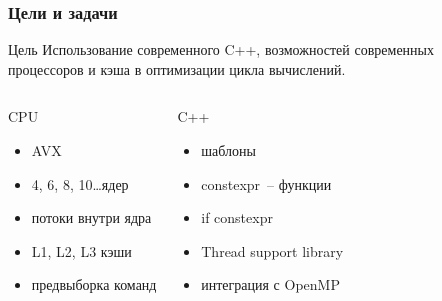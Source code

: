 \documentclass[presentation,18pt]{beamer}
\begin{document}
\begin{frame}[t]
	\label{goals}
	\frametitle{Цели и задачи}

	\begin{block}{Цель}
		Использование современного C++, возможностей современных процессоров и 
		кэша в оптимизации цикла вычислений.
	\end{block}

	\begin{columns}

		\begin{block}{CPU}
			\begin{itemize}
				\item AVX
				\item 4, 6, 8, 10\ldots ядер
				\item потоки внутри ядра
				\item L1, L2, L3 кэши
				\item предвыборка команд
			\end{itemize}
		\end{block}

		\begin{block}{C++}
			\begin{itemize}
				\item шаблоны
				\item constexpr~-- функции
				\item if constexpr
				\item Thread support library
				\item интеграция с OpenMP
			\end{itemize}
		\end{block}

	\end{columns}
\end{frame}
\end{document}
